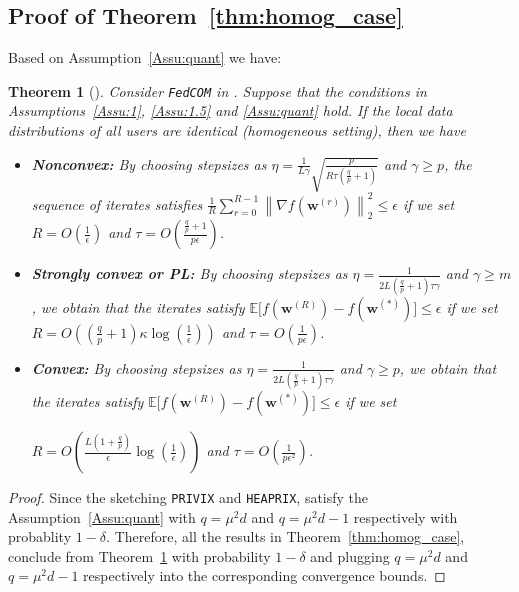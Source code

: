 \documentclass{article}
\newtheorem{theorem}{Theorem}
\begin{document}
\subsection{Proof of Theorem~\ref{thm:homog_case}}
Based on Assumption~\ref{Assu:quant} we have:
\begin{theorem}[\cite{haddadpour2020federated}]\label{thm:fromhaddad}
 Consider \texttt{FedCOM} in \cite{haddadpour2020federated}. Suppose that the conditions in Assumptions~\ref{Assu:1}, \ref{Assu:1.5} and \ref{Assu:quant} hold. If the local data distributions of all users are identical (homogeneous setting), then we have  
 \begin{itemize}
     \item \textbf{Nonconvex:}  By choosing stepsizes as $\eta=\frac{1}{L\gamma}\sqrt{\frac{p}{R\tau\left(\frac{q}{p}+1\right)}}$ and $\gamma\geq p$, the sequence of iterates satisfies  $\frac{1}{R}\sum_{r=0}^{R-1}\left\|\nabla f({\boldsymbol{w}}^{(r)})\right\|_2^2\leq {\epsilon}$ if we set
     $R=O\left(\frac{1}{\epsilon}\right)$ and $ \tau=O\left(\frac{\frac{q}{p}+1}{{p}\epsilon}\right)$.
     \item \textbf{Strongly convex or PL:}
      By choosing stepsizes as $\eta=\frac{1}{2L\left(\frac{q}{p}+1\right)\tau\gamma}$ and $\gamma\geq m$, we obtain that the iterates satisfy $\mathbb{E}\Big[f({\boldsymbol{w}}^{(R)})-f({\boldsymbol{w}}^{(*)})\Big]\leq \epsilon$ if  we set
     $R=O\left(\left(\frac{q}{p}+1\right)\kappa\log\left(\frac{1}{\epsilon}\right)\right)$ and $ \tau=O\left(\frac{1}{p\epsilon}\right)$.
     \item \textbf{Convex:} By choosing stepsizes as $\eta=\frac{1}{2L\left(\frac{q}{p}+1\right)\tau\gamma}$ and $\gamma\geq p$, we obtain that the iterates satisfy $ \mathbb{E}\Big[f({\boldsymbol{w}}^{(R)})-f({\boldsymbol{w}}^{(*)})\Big]\leq \epsilon$ if we set
     
     $R=O\left(\frac{L\left(1+\frac{q}{p}\right)}{\epsilon}\log\left(\frac{1}{\epsilon}\right)\right)$ and $ \tau=O\left(\frac{1}{p\epsilon^2}\right)$.
 \end{itemize}
\end{theorem}

\begin{proof}
Since the sketching \texttt{PRIVIX} and \texttt{HEAPRIX}, satisfy the Assumption~\ref{Assu:quant} with $q=\mu^2d$ and $q=\mu^2d-1$ respectively with probablity $1-\delta$.  Therefore, all the results in Theorem~\ref{thm:homog_case}, conclude from Theorem~\ref{thm:fromhaddad} with probability $1-\delta$ and plugging $q=\mu^2d$ and $q=\mu^2d-1$ respectively into the corresponding convergence bounds.
\end{proof}
\end{document}
